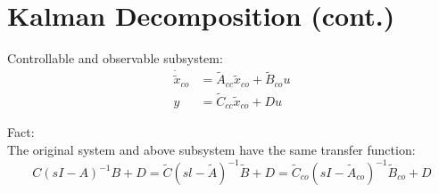 \documentclass[10pt,a4paper,oneside]{article}
\begin{document}
\section{Kalman Decomposition (cont.)}
Controllable and observable subsystem:
\[
\begin{aligned} \dot{\tilde{x}}_{c o} &=\tilde{A}_{c c} \tilde{x}_{c o}+\tilde{B}_{c o} u \\ y &=\tilde{C}_{c c} \tilde{x}_{c o}+D u \end{aligned}
\]

Fact:\\
The original system and above subsystem have the same transfer function:
\[
C(sI-A)^{-1} B+D=\tilde{C}(s l-\tilde{A})^{-1} \tilde{B}+D=\tilde{C}_{c o}\left(sI-\tilde{A}_{c o}\right)^{-1} \tilde{B}_{c o}+D
\]
\end{document}
